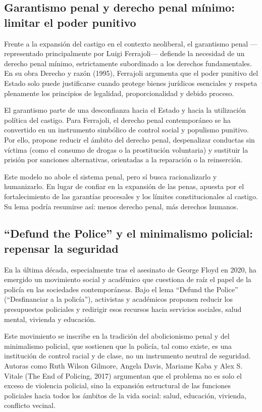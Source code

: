\documentclass[
  spanish,
  letterpaper,
  DIV=11,
  numbers=noendperiod]{scrreprt}
\begin{document}
\subsection{Garantismo penal y derecho penal mínimo: limitar el poder
punitivo}\label{garantismo-penal-y-derecho-penal-muxednimo-limitar-el-poder-punitivo}

Frente a la expansión del castigo en el contexto neoliberal, el
garantismo penal ---representado principalmente por Luigi Ferrajoli---
defiende la necesidad de un derecho penal mínimo, estrictamente
subordinado a los derechos fundamentales. En su obra Derecho y razón
(1995), Ferrajoli argumenta que el poder punitivo del Estado solo puede
justificarse cuando protege bienes jurídicos esenciales y respeta
plenamente los principios de legalidad, proporcionalidad y debido
proceso.

El garantismo parte de una desconfianza hacia el Estado y hacia la
utilización política del castigo. Para Ferrajoli, el derecho penal
contemporáneo se ha convertido en un instrumento simbólico de control
social y populismo punitivo. Por ello, propone reducir el ámbito del
derecho penal, despenalizar conductas sin víctima (como el consumo de
drogas o la prostitución voluntaria) y sustituir la prisión por
sanciones alternativas, orientadas a la reparación o la reinserción.

Este modelo no abole el sistema penal, pero sí busca racionalizarlo y
humanizarlo. En lugar de confiar en la expansión de las penas, apuesta
por el fortalecimiento de las garantías procesales y los límites
constitucionales al castigo. Su lema podría resumirse así: menos derecho
penal, más derechos humanos.

\subsection{``Defund the Police'' y el minimalismo policial: repensar la
seguridad}\label{defund-the-police-y-el-minimalismo-policial-repensar-la-seguridad}

En la última década, especialmente tras el asesinato de George Floyd en
2020, ha emergido un movimiento social y académico que cuestiona de raíz
el papel de la policía en las sociedades contemporáneas. Bajo el lema
``Defund the Police'' (``Desfinanciar a la policía''), activistas y
académicos proponen reducir los presupuestos policiales y redirigir esos
recursos hacia servicios sociales, salud mental, vivienda y educación.

Este movimiento se inscribe en la tradición del abolicionismo penal y
del minimalismo policial, que sostienen que la policía, tal como existe,
es una institución de control racial y de clase, no un instrumento
neutral de seguridad. Autoras como Ruth Wilson Gilmore, Angela Davis,
Mariame Kaba y Alex S. Vitale (The End of Policing, 2017) argumentan que
el problema no es solo el exceso de violencia policial, sino la
expansión estructural de las funciones policiales hacia todos los
ámbitos de la vida social: salud, educación, vivienda, conflicto
vecinal.
\end{document}
